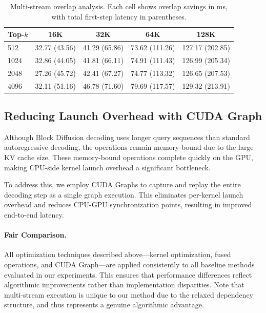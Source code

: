 \begin{table}[h]
\centering
\caption{Multi-stream overlap analysis. Each cell shows overlap savings in ms, with total first-step latency in parentheses.}
\label{tab:overlap}
\begin{tabular}{l|cccc}
\toprule
\textbf{Top-$k$} & \textbf{16K} & \textbf{32K} & \textbf{64K} & \textbf{128K} \\
\midrule
512  & 32.77 (43.56) & 41.29 (65.86) & 73.62 (111.26) & 127.17 (202.85) \\
1024 & 32.86 (44.05) & 41.81 (66.11) & 74.91 (111.43) & 126.99 (205.34) \\
2048 & 27.26 (45.72) & 42.41 (67.27) & 74.77 (113.32) & 126.65 (207.53) \\
4096 & 32.11 (51.16) & 46.78 (71.60) & 79.69 (117.57) & 129.32 (213.91) \\
\bottomrule
\end{tabular}
\end{table}

\subsection{Reducing Launch Overhead with CUDA Graph}
\label{appendix:cudagraph}

Although Block Diffusion decoding uses longer query sequences than standard autoregressive decoding, 
the operations remain memory-bound due to the large KV cache size.
These memory-bound operations complete quickly on the GPU, 
making CPU-side kernel launch overhead a significant bottleneck.

To address this, we employ CUDA Graphs to capture and replay the entire decoding step as a single graph execution. 
This eliminates per-kernel launch overhead and reduces CPU-GPU synchronization points, resulting in improved end-to-end latency.

\paragraph{Fair Comparison.}
All optimization techniques described above---kernel optimization, fused operations, and CUDA Graph---are applied consistently to all baseline methods evaluated in our experiments.
This ensures that performance differences reflect algorithmic improvements rather than implementation disparities.
Note that multi-stream execution is unique to our method due to the relaxed dependency structure, and thus represents a genuine algorithmic advantage.



